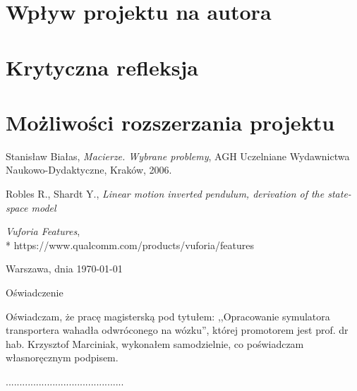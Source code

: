 \documentclass[12pt, oneside]{report}
\theoremstyle{definition}
\begin{document}
\section{Wpływ projektu na autora}
\section{Krytyczna refleksja}
\section{Możliwości rozszerzania projektu}

	
\pagestyle{plain}
\begin{thebibliography}{11}

 Stanisław Białas, \emph{Macierze. Wybrane problemy}, AGH Uczelniane Wydawnictwa Naukowo-Dydaktyczne, Kraków, 2006.

 Robles R., Shardt Y., \emph{Linear motion inverted pendulum, derivation of the state-space model}

 \emph{Vuforia Features},
\\*
https://www.qualcomm.com/products/vuforia/features

\end{thebibliography}


\clearpage
\pagestyle{empty}
\noindent Warszawa, dnia \today
\vspace{5cm}
\begin{center}
	\LARGE{Oświadczenie}
\end{center}
Oświadczam, że pracę magisterską pod tytułem: ,,Opracowanie symulatora transportera wahadła odwróconego na wózku'', której promotorem jest prof. dr hab. Krzysztof Marciniak, wykonałem samodzielnie, co poświadczam własnoręcznym podpisem.
\vspace{2cm}
\begin{flushright}
...........................................
\end{flushright}
\end{document}
